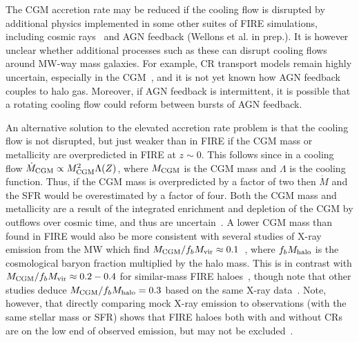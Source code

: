 \documentclass[fleqn,usenatbib]{mnras}
\newcommand{\Mdot}{\dot{M}}
\begin{document}
The CGM accretion rate may be reduced if the cooling flow is disrupted by additional physics implemented in some other suites of FIRE simulations, including cosmic rays~\citep{Chan2019, Hopkins2020a, Hopkins2021e, Hopkins2021d} and AGN feedback (Wellons et al. in prep.).
It is however unclear whether additional processes such as these can disrupt cooling flows around MW-way mass galaxies.
For example, CR transport models remain highly uncertain, especially in the CGM~\citep{Hopkins2021, Quataert2021, Quataert2021a}, and it is not yet known how AGN feedback couples to halo gas.
Moreover, if AGN feedback is intermittent, it is possible that a rotating cooling flow could reform between bursts of AGN feedback.

An alternative solution to the elevated accretion rate problem is that the cooling flow is not disrupted, but just weaker than in FIRE if the CGM mass or metallicity are overpredicted in FIRE at $z\sim0$.
This follows since in a cooling flow $\Mdot_{\rm CGM}\propto M_{\rm CGM}^2 \Lambda(Z)$, where $M_{\rm CGM}$ is the CGM mass and $\Lambda$ is the cooling function.
Thus, if the CGM mass is overpredicted by a factor of two then $\Mdot$ and the SFR would be overestimated by a factor of four.
Both the CGM mass and metallicity are a result of the integrated enrichment and depletion of the CGM by outflows over cosmic time, and thus are uncertain~\citep[e.g.,][]{Davies2021, Kelly2021}.
A lower CGM mass than found in FIRE would also be more consistent with several studies of X-ray emission from the MW which find $M_{\rm CGM}/f_bM_{\rm vir} \approx 0.1$~\citep[][]{Li2018, Bregman2018}, where $f_b M_{\rm halo}$ is the cosmological baryon fraction multiplied by the halo mass.
This is in contrast with $M_{\rm CGM}/f_bM_{\rm vir} \approx 0.2-0.4$ for similar-mass FIRE haloes~\citep{Hafen2019}, though note that other studies deduce $M_{\rm CGM}/f_bM_{\rm halo}=0.3$ based on the same X-ray data~\citep{Faerman2020}.
Note, however, that directly comparing mock X-ray emission to observations (with the same stellar mass or SFR) shows that FIRE haloes both with and without CRs are on the low end of observed emission, but may not be excluded~\citep{Chan2021}.
\end{document}
